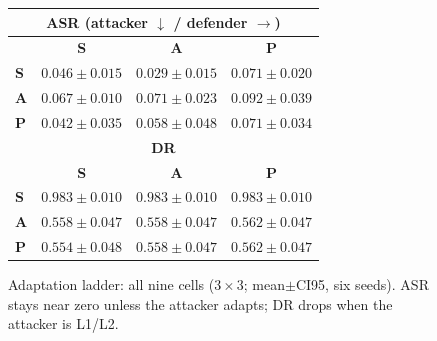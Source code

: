 \begin{figure}[!t]
\centering
\footnotesize
\setlength{\tabcolsep}{3pt}
\begin{tabular}{@{}lccc@{}}
\toprule
\multicolumn{4}{c}{\textbf{ASR} (attacker $\downarrow$ / defender $\rightarrow$)} \\
\midrule
 & \textbf{S} & \textbf{A} & \textbf{P} \\
\midrule
\textbf{S} & $0.046{\pm}0.015$ & $0.029{\pm}0.015$ & $0.071{\pm}0.020$ \\
\textbf{A} & $0.067{\pm}0.010$ & $0.071{\pm}0.023$ & $0.092{\pm}0.039$ \\
\textbf{P} & $0.042{\pm}0.035$ & $0.058{\pm}0.048$ & $0.071{\pm}0.034$ \\
\midrule
\multicolumn{4}{c}{\textbf{DR}} \\
\midrule
 & \textbf{S} & \textbf{A} & \textbf{P} \\
\midrule
\textbf{S} & $0.983{\pm}0.010$ & $0.983{\pm}0.010$ & $0.983{\pm}0.010$ \\
\textbf{A} & $0.558{\pm}0.047$ & $0.558{\pm}0.047$ & $0.562{\pm}0.047$ \\
\textbf{P} & $0.554{\pm}0.048$ & $0.558{\pm}0.047$ & $0.562{\pm}0.047$ \\
\bottomrule
\end{tabular}
\caption{Adaptation ladder: all nine cells ($3{\times}3$; mean$\pm$CI95, six seeds).
ASR stays near zero unless the attacker adapts; DR drops when the attacker is L1/L2.}
\label{fig:ladder}
\end{figure}
